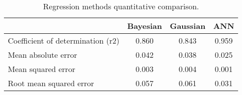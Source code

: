\begin{table}[htbp]
  \centering

    \begin{tabular}{lccc}
    \hline
          & Bayesian & Gaussian & ANN \\
          \hline
    Coefficient of determination (\acs{r2}) & 0.860  & 0.843 & 0.959 \\   
    Mean absolute error & 0.042 & 0.038 & 0.025 \\
    Mean squared error & 0.003 & 0.004 & 0.001 \\
    Root mean squared error & 0.057 & 0.061 & 0.031 \\
    \hline
    \end{tabular}%
      \caption{Regression methods quantitative comparison.}
  \label{tab:15regressionvalues}%
\end{table}%